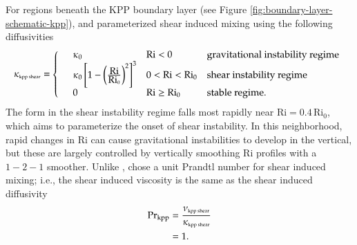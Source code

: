 For regions beneath the KPP boundary layer (see Figure
\ref{fig:boundary-layer-schematic-kpp}), \cite{LargeKPP} and
\cite{Large_Gent1999} parameterized shear induced mixing using the
following diffusivities
\begin{equation}
\begin{split}
  \kappa_{\mbox{\tiny kpp shear}}= \left\{
\begin{array}{llll}
&\kappa_{0}  &\mbox{Ri} < 0  &\mbox{gravitational instability regime} 
 \\
   &\kappa_{0} \left[1- \left(\frac{\mbox{Ri}}{\mbox{Ri}_0}\right)^2 \right]^3
   &0 < \mbox{Ri}  <  \mbox{Ri}_0   &\mbox{shear instability regime}
\\
 &0 &\mbox{Ri} \ge \mbox{Ri}_{0} &\mbox{stable regime.} 
\end{array}
 \right.
\label{eq:kappa-shear-kpp}
\end{split}
\end{equation}
The form in the shear instability regime falls most rapidly near
$\mbox{Ri} = 0.4 \, \mbox{Ri}_{0}$, which aims to parameterize the
onset of shear instability. In this neighborhood, rapid changes in
$\mbox{Ri}$ can cause gravitational instabilities to develop in the
vertical, but these are largely controlled by vertically smoothing
$\mbox{Ri}$ profiles with a $1-2-1$ smoother.  Unlike \cite{PPvmix},
\cite{LargeKPP} chose a unit Prandtl number for shear induced mixing;
i.e., the shear induced viscosity is the same as the shear induced
diffusivity
\begin{subequations}
\begin{align}
  \mbox{Pr}_{\mbox{\scriptsize kpp}} &= \frac{\nu_{\mbox{\tiny kpp shear}}}{\kappa_{\mbox{\tiny kpp  shear}}} 
 \\
 &= 1.
\end{align}
\end{subequations}

